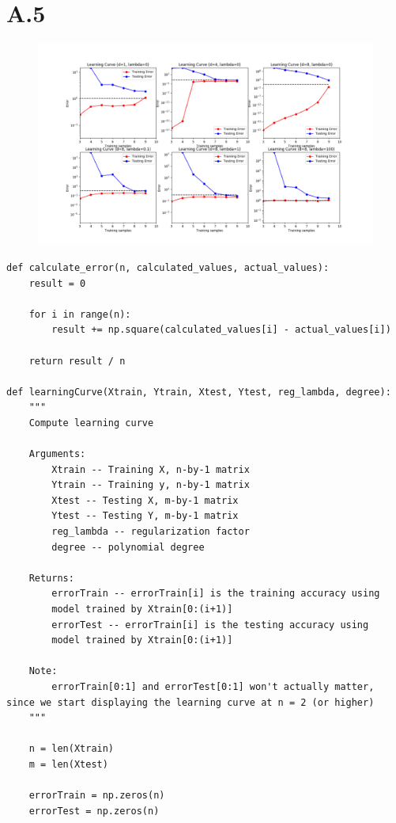 \documentclass{article}
\newcommand{\1}{\mathbf{1}}
\begin{document}
\section*{A.5}
{\Large 

\begin{figure}[ht!]
  \centering
  \includegraphics[width=215mm]{../hw1-code/results/a5.png}
\end{figure}
\begin{verbatim}
def calculate_error(n, calculated_values, actual_values):
    result = 0

    for i in range(n):
        result += np.square(calculated_values[i] - actual_values[i])

    return result / n

def learningCurve(Xtrain, Ytrain, Xtest, Ytest, reg_lambda, degree):
    """
    Compute learning curve

    Arguments:
        Xtrain -- Training X, n-by-1 matrix
        Ytrain -- Training y, n-by-1 matrix
        Xtest -- Testing X, m-by-1 matrix
        Ytest -- Testing Y, m-by-1 matrix
        reg_lambda -- regularization factor
        degree -- polynomial degree

    Returns:
        errorTrain -- errorTrain[i] is the training accuracy using
        model trained by Xtrain[0:(i+1)]
        errorTest -- errorTrain[i] is the testing accuracy using
        model trained by Xtrain[0:(i+1)]

    Note:
        errorTrain[0:1] and errorTest[0:1] won't actually matter, since we start displaying the learning curve at n = 2 (or higher)
    """

    n = len(Xtrain)
    m = len(Xtest)

    errorTrain = np.zeros(n)
    errorTest = np.zeros(n)


\end{verbatim}}
\end{document}
